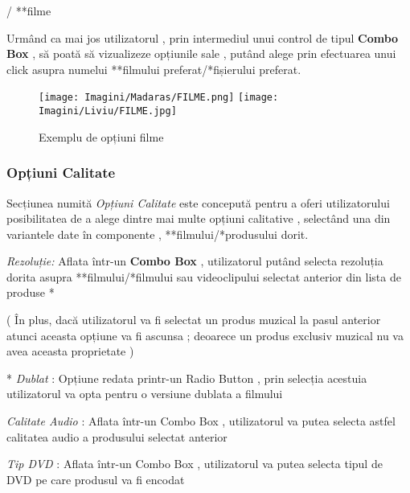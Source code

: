 \documentclass{amsart}
\begin{document}
/ **{filme}
\hfill \newline

Urmând ca mai jos utilizatorul , prin intermediul unui control de tipul \textbf{Combo Box} , să poată să vizualizeze opțiunile sale , putând alege prin efectuarea unui click asupra numelui **{filmului preferat}/*{fișierului preferat}.

\begin{figure}[h]
\centering
\texttt{[image: Imagini/Madaras/FILME.png]}
\texttt{[image: Imagini/Liviu/FILME.jpg]}
\caption{Exemplu de opțiuni filme}
\end{figure}
\hfill \newline

\newpage %

\subsubsection{\textbf{Opțiuni Calitate}}\hfill
\newline 

Secțiunea numită \textit{Opțiuni Calitate} este concepută pentru a oferi utilizatorului posibilitatea de a alege dintre mai multe opțiuni calitative , selectând una din variantele date în componente , **{filmului}/*{produsului} dorit.
\newline

\begin{enumerate}[label=\arabic*.] 

\item \textit{Rezoluție:} Aflata într-un \textbf{Combo Box} , utilizatorul putând selecta rezoluția dorita asupra **{filmului}/*{filmului sau videoclipului} selectat anterior din lista de produse *{( În plus, dacă utilizatorul va fi selectat un produs muzical la pasul anterior atunci aceasta opțiune va fi ascunsa ; deoarece un produs exclusiv muzical nu va avea aceasta proprietate )
\hfill \newline

\item **{ \textit{Dublat} : Opțiune redata printr-un Radio Button , prin selecția acestuia utilizatorul va opta pentru o versiune dublata a filmului}
\hfill \newline

\item *{\textit{Calitate Audio} : Aflata într-un Combo Box  , utilizatorul va putea selecta astfel calitatea audio a produsului selectat anterior }
\hfill \newline

\item *{\textit{Tip DVD}} : Aflata într-un Combo Box , utilizatorul va putea selecta tipul de DVD pe care produsul va fi encodat}



\end{enumerate}
\end{document}
